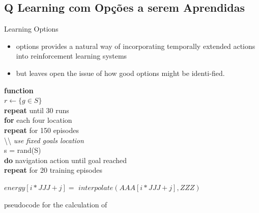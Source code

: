\subsection{Q Learning com Opções a serem Aprendidas}

\begin{frame}{Learning Options}
    \begin{itemize}
        \item options provides a natural way of incorporating temporally extended actions into reinforcement learning systems
        \item but leaves open the issue of how good options might be identi-fied.\nocite{stolle2002learning}
    \end{itemize}
\end{frame}

\begin{frame}{}
    \textbf{function} \\
    \hspace{10} $r \leftarrow \{g \in S\}$ \\
    \hspace{10} \textbf{repeat} until 30 runs\\
    \hspace{20} \textbf{for} each four location\\
    \hspace{30} \textbf{repeat} for 150 episodes\\
    \hspace{40} \textbackslash{}\textbackslash{} \textit{use fixed goals location}\\
    \hspace{50} s = rand(S)\\
    \hspace{50} \textbf{do} navigation action until goal reached\\
    \hspace{50} \textbf{repeat} for 20 training episodes\\
\end{frame}

\begin{frame}{}
    \begin{algorithm}[H]
        \begin{algorithmic}%
            \STATE $energy[i*JJJ+j] =$ 
            $ interpolate(AAA[i*JJJ+j], ZZZ)$
            \ENDFOR
            \ENDFOR
        \end{algorithmic}
        \caption{pseudocode for the calculation of }
        \label{alg:seq}
    \end{algorithm}
\end{frame}

